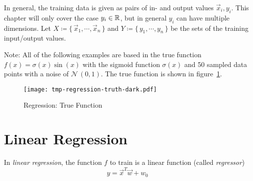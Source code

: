 	In general, the training data is given as pairs of in- and output values \( \vec{x}_i, y_i \). This chapter will only cover the case \( y_i \in \mathbb{R} \), but in general \(y_i\) can have multiple dimensions. Let \( X \coloneqq \{\, \vec{x}_1, \cdots, \vec{x}_n \,\} \) and \( Y \coloneqq \{\, y_1, \cdots, y_n \,\} \) be the sets of the training input/output values.

	Note: All of the following examples are based in the true function \( f(x) = \sigma(x) \sin(x) \) with the sigmoid function \( \sigma(x) \) and 50 sampled data points with a noise of \( \mathcal{N}\,(0, 1) \). The true function is shown in figure~\ref{fig:regressionTrue}.
	
	\begin{figure}
		\centering
		\texttt{[image: tmp-regression-truth-dark.pdf]}
		\caption{Regression: True Function}
		\label{fig:regressionTrue}
	\end{figure}

	\section{Linear Regression}
		In \emph{linear regression}, the function \(f\) to train is a linear function (called \emph{regressor})
		\begin{equation}
			y = \vec{x}^T \vec{w} + w_0
		\end{equation}

